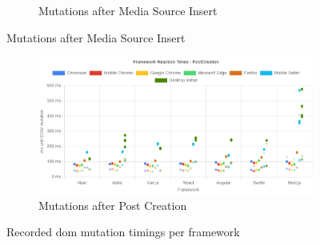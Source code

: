 \documentclass[a4paper, 12pt]{article}
\begin{document}
\begin{figure}[ht!]
\begin{subfigure}{0.8\linewidth}
\begin{center}
    \end{center}
    \caption{Mutations after Media Source Insert}\label{subfig:PW:mediaSourceInsert}
  \end{subfigure}
\end{figure}
\begin{figure}[ht!]\ContinuedFloat
  \centering
  \begin{subfigure}{0.8\linewidth}
    \begin{center}
      \includegraphics[width=\linewidth, keepaspectratio]{img/playwright-results/userActions_byUserAction/postCreation.png}
    \end{center}
    \caption{Mutations after Post Creation}\label{subfig:PW:postCreation}
  \end{subfigure}
  \caption{Recorded \acrshort{dom} mutation timings per framework}
  \label{fig:playwrightResults:frameworks}
\end{figure}
\end{document}
